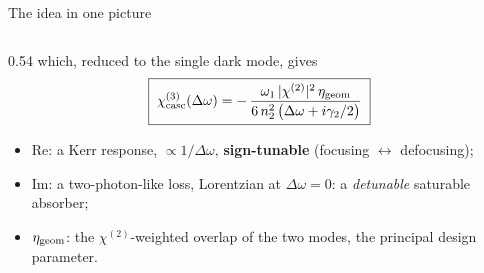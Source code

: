 \documentclass[aspectratio=169,10pt]{beamer}
\newcommand{\chitwo}{\chi^{(2)}}
\newcommand{\chicasc}{\chi^{(3)}_{\mathrm{casc}}}
\newcommand{\Dom}{\Delta\omega}
\newcommand{\gtwo}{\gamma_2}
\begin{document}
\begin{frame}{The idea in one picture}
\begin{columns}[T]
\begin{column}{0.54\linewidth}
      which, reduced to the single dark mode, gives
      \vspace{-4pt}
      \[
        \boxed{\;\chicasc(\Dom) = -\,\frac{\omega_1\,|\chitwo|^2\,\eta_{\rm geom}}
                                          {6\,n_2^2\,\bigl(\Dom + i\gtwo/2\bigr)}\;}
      \]
      \vspace{-8pt}
      \begin{itemize}\setlength\itemsep{1pt}
        \item $\mathrm{Re}$: a Kerr response, $\propto 1/\Dom$,
              \textbf{sign-tunable} (focusing $\leftrightarrow$ defocusing);
        \item $\mathrm{Im}$: a two-photon-like loss, Lorentzian at $\Dom=0$:
              a \emph{detunable} saturable absorber;
        \item $\eta_{\rm geom}$: the $\chitwo$-weighted overlap of the two modes,
              the principal design parameter.
      \end{itemize}
    \end{column}
  \end{columns}
\end{frame}
\end{document}
